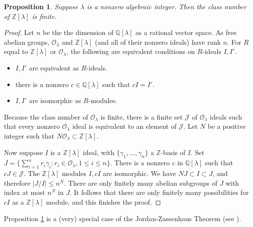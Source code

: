 \documentclass{amsart}
\newtheorem{prop}[equation]{Proposition}
\theoremstyle{definition}
\theoremstyle{definition}
\newcommand{\Z}{\mathbb Z}
\newcommand{\Q}{\mathbb Q}
\numberwithin{equation}{subsection}
\begin{document}
\begin{prop} \label{finiteclass}
Suppose $\lambda$ is a nonzero algebraic integer.
Then the class number of $\Z[\lambda ]$ is finite.
\end{prop}
\begin{proof}
Let $n$ be the the dimension of
$\Q [\lambda ]$ as a rational vector space.
As  free abelian groups,
$\mathcal O_{\lambda}$ and
$\Z[\lambda ] $ (and all of their nonzero ideals) have
rank $n$. For $R$ equal to
$\Z[\lambda ]$
or $\mathcal O_{\lambda}$, the following are equivalent conditions on
$R$-ideals $I,I'$.
\begin{itemize}
\item
$I,I'$ are equivalent as $R$-ideals.
\item there is a nonzero $c\in \Q [\lambda] $ such that $cI=I'$.
\item $I,I'$ are isomorphic as $R$-modules.
\end{itemize}
Because the class number of $\mathcal O_{\lambda}$ is finite,
there is a finite set $\mathcal J$
of $\mathcal O_{\lambda}$ ideals such  that every nonzero
$\mathcal O_{\lambda}$ ideal is equivalent to an element of
$\mathcal J$.
Let $N$ be
a positive integer such that $N\mathcal O_{\lambda}
\subset \Z[\lambda ] $.

Now suppose $I$ is a $\Z [\lambda ]$ ideal, with
$\{\gamma_1, \dots , \gamma_n\}$ a $\Z$-basis of $I$.
Set
$J=\{ \sum_{i=1}^n r_i\gamma_i: r_i \in \mathcal O_{\lambda}, 1\leq i \leq n \}$.
There is a nonzero  $c$ in $\Q[\lambda ]$
such that $cJ \in \mathcal J$.
The $\Z[\lambda ]$ modules
$I, cI$ are
isomorphic.
We have $NJ \subset I \subset J$, and therefore $|J/I| \leq n^N$.
There are only finitely many abelian subgroups of $J$ with
index at most $n^N$ in $J$. It follows that there are only finitely
many possibilities for $cI$ as a $\Z[\lambda ]$ module,
and this finishes the proof.
\end{proof}

Proposition \ref{finiteclass} is a (very) special case of the
Jordan-Zassenhaus Theorem (see \cite{reinerMaximalOrders}).
\end{document}
